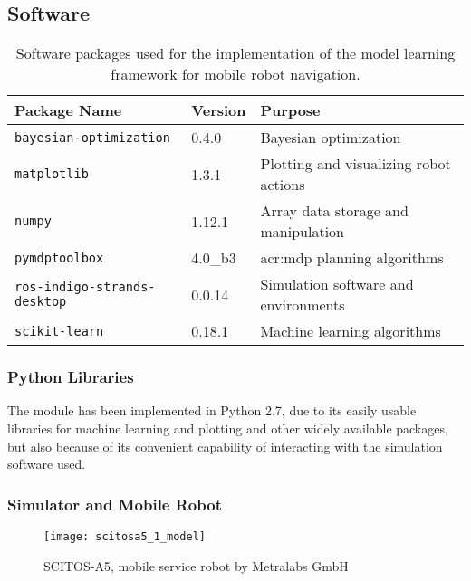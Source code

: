 \subsection{Software}
\label{sec:software}

\begin{table}[pt]
\caption{Software packages used for the implementation of the model learning framework for mobile robot navigation.}
\label{tab:software-packages}\centering
\begin{tabular}{lll}
	\hline%
	\textbf{Package Name} & \textbf{Version} & \textbf{Purpose} \\
	\hline
	\texttt{bayesian-optimization} & 0.4.0 & Bayesian optimization \\
	\texttt{matplotlib} & 1.3.1 & Plotting and visualizing robot actions \\
	\texttt{numpy} & 1.12.1 & Array data storage and manipulation\\ 
	\texttt{pymdptoolbox} & 4.0\_b3 & \acrshort{acr:mdp} planning algorithms \\
	\texttt{ros-indigo-strands-desktop} & 0.0.14 & Simulation software and environments\\
	\texttt{scikit-learn} & 0.18.1 & Machine learning algorithms \\ \hline
\end{tabular}
\end{table}

\subsubsection{Python Libraries}
\label{sec:software-packages}
The module has been implemented in Python 2.7, due to its easily usable libraries for machine learning and plotting and other widely available packages, but also because of its convenient capability of interacting with the simulation software used.

\subsubsection{Simulator and Mobile Robot}
\label{sec:simulator}

\begin{figure}[t]
	\centering
	\texttt{[image: scitosa5\_1\_model]}
	\caption{SCITOS-A5, mobile service robot by Metralabs GmbH \cite{Metralabs}}
	\label{fig:scitosa5}
\end{figure}

